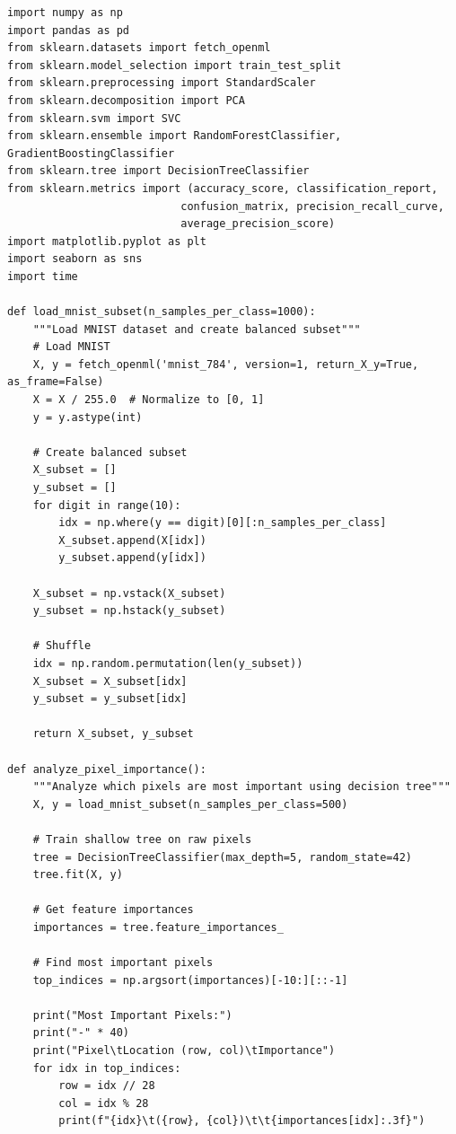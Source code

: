 \documentclass[12pt,a4paper]{article}
\theoremstyle{definition}
\begin{document}
\begin{lstlisting}[caption={MNIST Classification Implementation}]
import numpy as np
import pandas as pd
from sklearn.datasets import fetch_openml
from sklearn.model_selection import train_test_split
from sklearn.preprocessing import StandardScaler
from sklearn.decomposition import PCA
from sklearn.svm import SVC
from sklearn.ensemble import RandomForestClassifier, GradientBoostingClassifier
from sklearn.tree import DecisionTreeClassifier
from sklearn.metrics import (accuracy_score, classification_report, 
                           confusion_matrix, precision_recall_curve,
                           average_precision_score)
import matplotlib.pyplot as plt
import seaborn as sns
import time

def load_mnist_subset(n_samples_per_class=1000):
    """Load MNIST dataset and create balanced subset"""
    # Load MNIST
    X, y = fetch_openml('mnist_784', version=1, return_X_y=True, as_frame=False)
    X = X / 255.0  # Normalize to [0, 1]
    y = y.astype(int)
    
    # Create balanced subset
    X_subset = []
    y_subset = []
    for digit in range(10):
        idx = np.where(y == digit)[0][:n_samples_per_class]
        X_subset.append(X[idx])
        y_subset.append(y[idx])
    
    X_subset = np.vstack(X_subset)
    y_subset = np.hstack(y_subset)
    
    # Shuffle
    idx = np.random.permutation(len(y_subset))
    X_subset = X_subset[idx]
    y_subset = y_subset[idx]
    
    return X_subset, y_subset

def analyze_pixel_importance():
    """Analyze which pixels are most important using decision tree"""
    X, y = load_mnist_subset(n_samples_per_class=500)
    
    # Train shallow tree on raw pixels
    tree = DecisionTreeClassifier(max_depth=5, random_state=42)
    tree.fit(X, y)
    
    # Get feature importances
    importances = tree.feature_importances_
    
    # Find most important pixels
    top_indices = np.argsort(importances)[-10:][::-1]
    
    print("Most Important Pixels:")
    print("-" * 40)
    print("Pixel\tLocation (row, col)\tImportance")
    for idx in top_indices:
        row = idx // 28
        col = idx % 28
        print(f"{idx}\t({row}, {col})\t\t{importances[idx]:.3f}")
    

\end{lstlisting}
\end{document}
